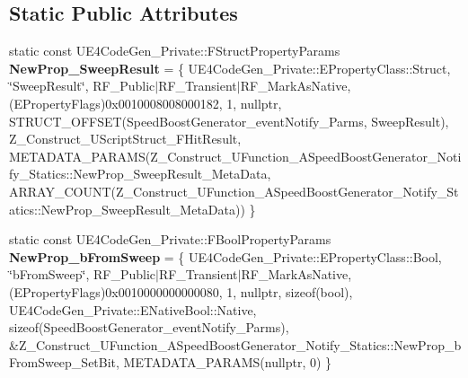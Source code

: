 \subsection*{Static Public Attributes}
\begin{DoxyCompactItemize}
\item 
\mbox{\label{struct_z___construct___u_function___a_speed_boost_generator___notify___statics_ab0df0022b2933f9b6cc0a7b099eceb4e}} 
static const U\+E4\+Code\+Gen\+\_\+\+Private\+::\+F\+Struct\+Property\+Params {\bfseries New\+Prop\+\_\+\+Sweep\+Result} = \{ U\+E4\+Code\+Gen\+\_\+\+Private\+::\+E\+Property\+Class\+::\+Struct, \char`\"{}Sweep\+Result\char`\"{}, R\+F\+\_\+\+Public$\vert$R\+F\+\_\+\+Transient$\vert$R\+F\+\_\+\+Mark\+As\+Native, (E\+Property\+Flags)0x0010008008000182, 1, nullptr, S\+T\+R\+U\+C\+T\+\_\+\+O\+F\+F\+S\+E\+T(\+Speed\+Boost\+Generator\+\_\+event\+Notify\+\_\+\+Parms, Sweep\+Result), Z\+\_\+\+Construct\+\_\+\+U\+Script\+Struct\+\_\+\+F\+Hit\+Result, M\+E\+T\+A\+D\+A\+T\+A\+\_\+\+P\+A\+R\+A\+M\+S(\+Z\+\_\+\+Construct\+\_\+\+U\+Function\+\_\+\+A\+Speed\+Boost\+Generator\+\_\+\+Notify\+\_\+\+Statics\+::\+New\+Prop\+\_\+\+Sweep\+Result\+\_\+\+Meta\+Data, A\+R\+R\+A\+Y\+\_\+\+C\+O\+U\+N\+T(\+Z\+\_\+\+Construct\+\_\+\+U\+Function\+\_\+\+A\+Speed\+Boost\+Generator\+\_\+\+Notify\+\_\+\+Statics\+::\+New\+Prop\+\_\+\+Sweep\+Result\+\_\+\+Meta\+Data)) \}
\item 
\mbox{\label{struct_z___construct___u_function___a_speed_boost_generator___notify___statics_aee4f5562b0937ca6c6fe3238fb905ff6}} 
static const U\+E4\+Code\+Gen\+\_\+\+Private\+::\+F\+Bool\+Property\+Params {\bfseries New\+Prop\+\_\+b\+From\+Sweep} = \{ U\+E4\+Code\+Gen\+\_\+\+Private\+::\+E\+Property\+Class\+::\+Bool, \char`\"{}b\+From\+Sweep\char`\"{}, R\+F\+\_\+\+Public$\vert$R\+F\+\_\+\+Transient$\vert$R\+F\+\_\+\+Mark\+As\+Native, (E\+Property\+Flags)0x0010000000000080, 1, nullptr, sizeof(bool), U\+E4\+Code\+Gen\+\_\+\+Private\+::\+E\+Native\+Bool\+::\+Native, sizeof(\+Speed\+Boost\+Generator\+\_\+event\+Notify\+\_\+\+Parms), \&\+Z\+\_\+\+Construct\+\_\+\+U\+Function\+\_\+\+A\+Speed\+Boost\+Generator\+\_\+\+Notify\+\_\+\+Statics\+::\+New\+Prop\+\_\+b\+From\+Sweep\+\_\+\+Set\+Bit, M\+E\+T\+A\+D\+A\+T\+A\+\_\+\+P\+A\+R\+A\+M\+S(nullptr, 0) \}
\item 
\mbox{\label{struct_z___construct___u_function___a_speed_boost_generator___notify___statics_a8b3c2dd0d674bc184859719d3f0fa5f4}} 

\end{DoxyCompactItemize}

